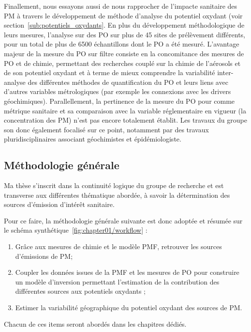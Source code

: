 Finallement, nous essayons aussi de nous rapprocher de l'impacte sanitaire des PM à
travers le développement de méthode d'analyse du potentiel oxydant (voir
section~\ref{sub:potentiels_oxydants}. En plus du développement méthodologique de leurs
mesures, l'analyse sur des PO sur plus de 45 sites de prélèvement différents, pour un
total de plus de 6500 échantillons dont le PO a été mesuré.
L'avantage majeur de la mesure du PO sur filtre consiste en la concomitance des mesures de
PO et de chimie, permettant des recherches couplé sur la chimie de l'aérosols et de son
potentiel oxydant et à terme de mieux comprendre la variabilité inter-analyse des différentes
méthodes de quantification du PO et leurs liens avec d'autres variables métrologiques (par
exemple les connexions avec les drivers géochimiques). Parallellement, la pertinence de la
mesure du PO pour comme métrique sanitaire et sa comparaison avec la variable
réglementaire en vigueur (la concentration des PM) n'est pas encore totalement établit.
Les travaux du groupe son donc également focalisé sur ce point, notamment par des travaux
pluridisciplinaires associant géochimistes et épidémiologiste.

\subsection{Méthodologie générale}%
\label{sub:méthodologie_general}

Ma thèse s'inscrit dans la continuité logique du groupe de recherche et est transverse aux
différentes thématique abordée, à savoir la détermination des sources d'émission d'intérêt
sanitaire.

Pour ce faire, la méthodologie générale suivante est donc adoptée et résumée sur le schéma
synthétique~\ref{fig:chapter01/workflow} :

\begin{enumerate}
    \item Grâce aux mesures de chimie et le modèle PMF, retrouver les sources d'émissions
        de PM;
    \item Coupler les données issues de la PMF et les mesures de PO pour construire un
        modèle d'inversion permettant l'estimation de la contribution des différentes
        sources aux potentiels oxydants ;
    \item Estimer la variabilité géographique du potentiel oxydant des sources de PM.
\end{enumerate}

Chacun de ces items seront abordés dans les chapitres dédiés.

